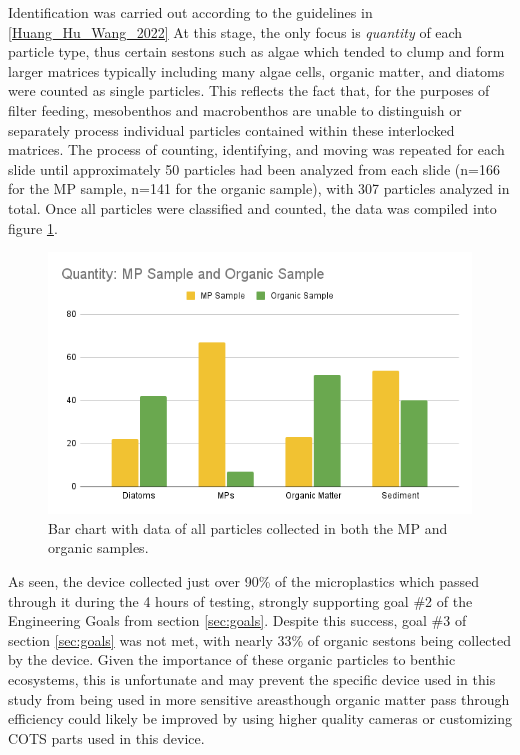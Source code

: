 \documentclass[fleqn,10pt]{SelfArx} %
\begin{document}
	Identification was carried out according to the guidelines in \ref{Huang_Hu_Wang_2022} At this stage, the only focus is \emph{quantity} of each particle type, thus certain \glspl{seston} such as algae which tended to clump and form larger matrices typically including many algae cells, organic matter, and diatoms were counted as single particles. This reflects the fact that, for the purposes of filter feeding, mesobenthos and macrobenthos are unable to distinguish or separately process individual particles contained within these interlocked matrices. The process of counting, identifying, and moving was repeated for each slide until approximately 50 particles had been analyzed from each slide (n=166 for the MP sample, n=141 for the organic sample), with 307 particles analyzed in total. Once all particles were classified and counted, the data was compiled into figure \ref{fig:mpcounting}.
	\begin{figure}[h]
		\centering
		\includegraphics[width=1\linewidth]{Figures/MPOrganicCounting}
		\caption[Collected Particle Classification]{Bar chart with data of all particles collected in both the MP and organic samples.}
		\label{fig:mpcounting}
	\end{figure}
	
	As seen, the device collected just over 90\% of the microplastics which passed through it during the 4 hours of testing, strongly supporting goal \#2 of the Engineering Goals from section \ref{sec:goals}. Despite this success, goal \#3 of section \ref{sec:goals} was not met, with nearly 33\% of organic \glspl{seston} being collected by the device. Given the importance of these organic particles to \gls{benthic} ecosystems, this is unfortunate and may prevent the specific device used in this study from being used in more sensitive areas\textemdash though organic matter pass through efficiency could likely be improved by using higher quality cameras or customizing COTS parts used in this device.
	
\end{document}
